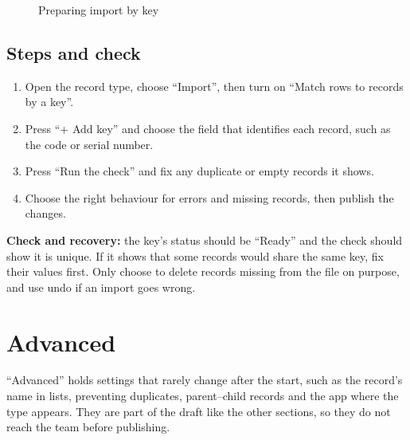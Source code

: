 \begin{figure}[H]
\centering
{}
\rclegend
\caption{Preparing import by key}
\label{fig:builder-import-flow}
\end{figure}

\subsection{Steps and check}
\begin{enumerate}
\item Open the record type, choose “Import”, then turn on “Match rows to records by a key”.
\item Press “+ Add key” and choose the field that identifies each record, such as the code or serial number.
\item Press “Run the check” and fix any duplicate or empty records it shows.
\item Choose the right behaviour for errors and missing records, then publish the changes.
\end{enumerate}

\textbf{Check and recovery:} the key's status should be “Ready” and the check should show it is unique. If it shows that some records would share the same key, fix their values first. Only choose to delete records missing from the file on purpose, and use undo if an import goes wrong.

\clearpage
\section{Advanced}
\label{sec:builder-feature-advanced}

“Advanced” holds settings that rarely change after the start, such as the record's name in lists, preventing duplicates, parent–child records and the app where the type appears. They are part of the draft like the other sections, so they do not reach the team before publishing.

